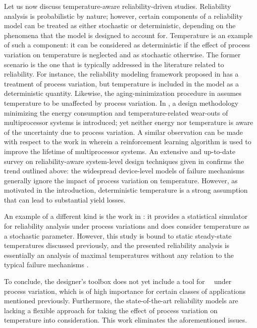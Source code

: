 Let us now discuss temperature-aware reliability-driven studies.
Reliability analysis is probabilistic by nature; however, certain components of a reliability model can be treated as either stochastic or deterministic, depending on the phenomena that the model is designed to account for.
Temperature is an example of such a component: it can be considered as deterministic if the effect of process variation on temperature is neglected and as stochastic otherwise.
The former scenario is the one that is typically addressed in the literature related to reliability.
For instance, the reliability modeling framework proposed in \cite{xiang2010} has a treatment of process variation, but temperature is included in the model as a deterministic quantity.
Likewise, the aging-minimization procedure in \cite{ukhov2012} assumes temperature to be unaffected by process variation.
In \cite{das2014a}, a design methodology minimizing the energy consumption and temperature-related wear-outs of multiprocessor systems is introduced; yet neither energy nor temperature is aware of the uncertainty due to process variation.
A similar observation can be made with respect to the work in \cite{das2014c} wherein a reinforcement learning algorithm is used to improve the lifetime of multiprocessor systems.
An extensive and up-to-date survey on reliability-aware system-level design techniques given in \cite{das2014b} confirms the trend outlined above: the widespread device-level models of failure mechanisms generally ignore the impact of process variation on temperature.
However, as motivated in the introduction, deterministic temperature is a strong assumption that can lead to substantial yield losses.

An example of a different kind is the work in \cite{lee2013}: it provides a statistical simulator for reliability analysis under process variations and does consider temperature as a stochastic parameter.
However, this study is bound to static steady-state temperatures discussed previously, and the presented reliability analysis is essentially an analysis of maximal temperatures without any relation to the typical failure mechanisms \cite{jedec}.

To conclude, the designer's toolbox does not yet include a tool for \DSS\ \ta\ under process variation, which is of high importance for certain classes of applications mentioned previously.
Furthermore, the state-of-the-art reliability models are lacking a flexible approach for taking the effect of process variation on temperature into consideration.
This work eliminates the aforementioned issues.
